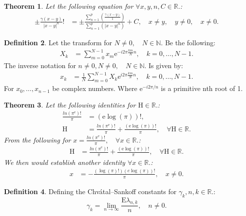 \documentclass[10pt]{article}
\theoremstyle{plain}
\newtheorem{theorem}{Theorem}[section]
\theoremstyle{definition}
\newtheorem{definition}[theorem]{Definition}
\theoremstyle{remark}
\begin{document}
\begin{theorem}
	Let the following equation for $\forall x, y, n, C \in \mathbb{R}.$:
	\begin{align*}
		\pm \frac{\gamma(x-y)}{|x - y|^{n}}! &= \pm \frac{\sum_{n=1}^{p}(\frac{\gamma(x-y)}{1})}{\sum_{n=1}^{p}(|x - y|^{n})} + C, \quad x \neq y, \quad y \neq 0, \quad x \neq 0.
	\end{align*}
\end{theorem}

\begin{definition}
	Let the transform for $N \neq 0, \quad N \in \mathbb{N}.$ Be the following:
	\begin{align*}
		X_k &= \sum_{m=0}^{N-1} x_{m}\mathrm{e}^{-i2\pi \frac{km}{N}n}, \quad k = 0,\dots,N-1.
	\end{align*}
	The inverse notation for $n \neq 0, N \neq 0, \quad N \in \mathbb{N}.$ Is given by:
	\begin{align*}
		x_k &= \frac{1}{N} \sum_{m=0}^{N-1} X_k \mathrm{e}^{i2\pi \frac{km}{N}n}, \quad k = 0,\dots,N-1.
	\end{align*}
	For $x_{0}, \dots, x_{n-1}$ be complex numbers. Where $\mathrm{e}^{-i2\pi /n}$ is a primitive nth root of 1.
\end{definition}

\begin{theorem}
	Let the following identities for $\mathrm{H} \in \mathbb{R}.$:
	\begin{align*}
		\frac{ln(\pi^\mathrm{e})!}{\pi} &= (\mathrm{e} \log(\pi))!,\\
		\mathrm{H} &= \frac{ln(\pi^\mathrm{e})!}{\pi} + \frac{(\mathrm{e} \log(\pi))!}{\pi}, \quad \forall \mathrm{H} \in \mathbb{R}.
	\end{align*}
	From the following for $x = \frac{ln(\pi^\mathrm{e})!}{\pi}, \quad \forall x \in \mathbb{R}.$:
	\begin{align*}
	\mathrm{H} &= \frac{ln(\pi^\mathrm{e})!}{\pi} + \frac{(\mathrm{e} \log(\pi))!}{\pi}, \quad \forall \mathrm{H} \in \mathbb{R}.
	\end{align*}
	We then would establish another identity $\forall x \in \mathbb{R}.$:
	\begin{align*}
		x &= -\frac{(\log(\pi)!) (e \log(\pi))!}{\pi}, \quad x \neq 0.
	\end{align*}
\end{theorem}

\begin{definition}
	Defining the Chvátal–Sankoff constants for $\gamma_k, n, k \in \mathbb{R}.$:
	\begin{equation}
		\gamma_k = \lim_{n \to \infty} \frac{\mathrm{E}{\lambda_{n, k}}}{n}, \quad n \neq 0.
	\end{equation}
\end{definition}
\end{document}
